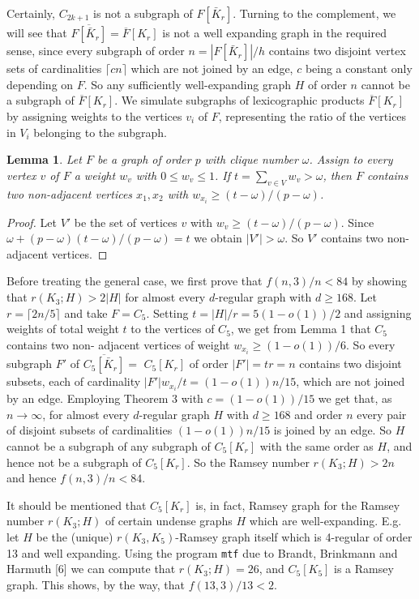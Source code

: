 \documentclass[12pt,a4paper]{article}
\newtheorem{lemma}{Lemma}
\begin{document}
Certainly, $C_{2k+1}$ is not a subgraph of $F[\bar{K}_r]$. Turning to the complement, we
will see that $\overline{F[\bar{K}_r]}=\overline{F}[K_r]$ is not a well expanding graph in the required sense,
since every subgraph of order $n=|F[\bar{K}_r]|/h$ contains two disjoint vertex sets of
cardinalities $\lceil cn\rceil$ which are not joined by an edge, $c$ being a constant only depending
on $F$. So any sufficiently well-expanding graph $H$ of order $n$ cannot be a subgraph of
$\overline{F}[K_r]$. We simulate subgraphs of lexicographic products $\overline{F}[K_r]$ by assigning weights
to the vertices $v_i$ of $F$, representing the ratio of the vertices in $V_i$ belonging to the
subgraph.

\begin{lemma}
Let $F$ be a graph of order $p$ with clique number $\omega$. Assign to every vertex
$v$ of $F$ a weight $w_v$ with $0\le w_v\le 1$. If $t=\sum_{v\in V}w_v>\omega$, then $F$ contains two
non-adjacent vertices $x_1,x_2$ with $w_{x_i}\ge (t-\omega)/(p-\omega)$.
\end{lemma}

\begin{proof}
Let $V'$ be the set of vertices $v$ with $w_v\ge (t-\omega)/(p-\omega)$. Since $\omega+(p-
\omega)(t-\omega)/(p-\omega)=t$ we obtain $|V'|>\omega$. So $V'$ contains two non-adjacent vertices.
\end{proof}

Before treating the general case, we first prove that $f(n,3)/n<84$ by showing
that $r(K_3;H)>2|H|$ for almost every $d$-regular graph with $d\ge 168$. Let $r=\lceil 2n/5\rceil$
and take $F=C_5$. Setting $t=|H|/r=5(1-o(1))/2$ and assigning weights of total
weight $t$ to the vertices of $C_5$, we get from Lemma 1 that $C_5$ contains two non-
adjacent vertices of weight $w_{x_i}\ge (1-o(1))/6$. So every subgraph $F'$ of $\overline{C_5[\bar{K}_r]}=$
$C_5[K_r]$ of order $|F'|=tr=n$ contains two disjoint subsets, each of cardinality
$|F'|w_{x_i}/t=(1-o(1))n/15$, which are not joined by an edge. Employing Theorem 3
with $c=(1-o(1))/15$ we get that, as $n\to\infty$, for almost every $d$-regular graph $H$
with $d\ge 168$ and order $n$ every pair of disjoint subsets of cardinalities $(1-o(1))n/15$
is joined by an edge. So $H$ cannot be a subgraph of any subgraph of $C_5[K_r]$ with the
same order as $H$, and hence not be a subgraph of $C_5[K_r]$. So the Ramsey number
$r(K_3;H)>2n$ and hence $f(n,3)/n<84$.

It should be mentioned that $C_5[K_r]$ is, in fact, Ramsey graph for the Ramsey
number $r(K_3;H)$ of certain undense graphs $H$ which are well-expanding. E.g. let
$H$ be the (unique) $r(K_3,K_5)$-Ramsey graph itself which is 4-regular of order 13 and
well expanding. Using the program \texttt{mtf} due to Brandt, Brinkmann and Harmuth [6]
we can compute that $r(K_3;H)=26$, and $C_5[K_5]$ is a Ramsey graph. This shows,
by the way, that $f(13,3)/13<2$.
\end{document}
